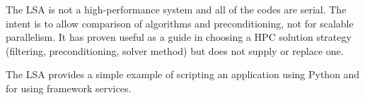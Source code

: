 The LSA is not a high-performance system and all of the codes are serial.
The intent is to allow comparison of algorithms and preconditioning, not
for scalable parallelism. It has proven useful as a guide in choosing a HPC
solution strategy (filtering, preconditioning, solver method) but does not
supply or replace one.

The LSA provides a simple example of scripting an application using Python
and for using framework services.
